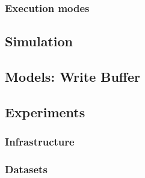 \documentclass{IEEEtran}
\begin{document}
\subsubsection{Execution modes} %






\subsection{Simulation} %

\subsection{Models: Write Buffer} %




\subsection{Experiments} %

\subsubsection{Infrastructure} %


\subsubsection{Datasets} %
\end{document}
